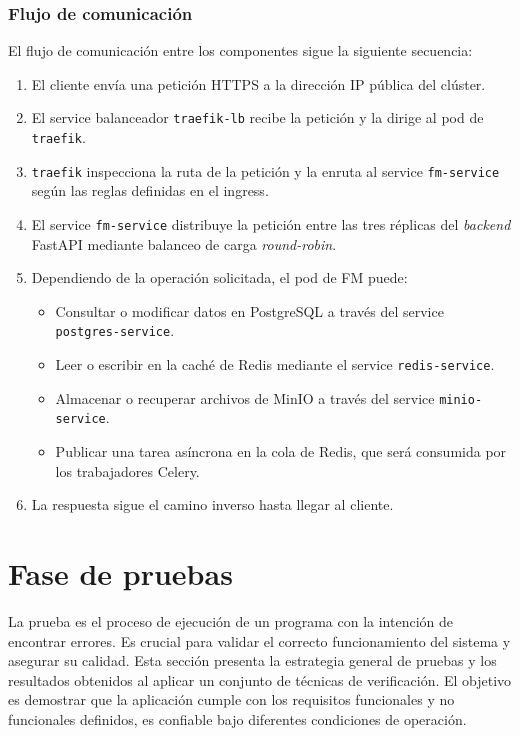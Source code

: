 \subsubsection{Flujo de comunicación}

El flujo de comunicación entre los componentes sigue la siguiente secuencia:

\begin{enumerate}
    \item El cliente envía una petición \ac{HTTPS} a la dirección \ac{IP} pública del \gls{clúster}.
    \item El \gls{service} balanceador \texttt{traefik-lb} recibe la petición y la dirige al \gls{pod} de \texttt{traefik}.
    \item \texttt{traefik} inspecciona la ruta de la petición y la enruta al \gls{service} \texttt{fm-service} según las reglas definidas en el \gls{ingress}.
    \item El \gls{service} \texttt{fm-service} distribuye la petición entre las tres réplicas del \textit{backend} FastAPI mediante balanceo de carga \textit{round-robin}.
    \item Dependiendo de la operación solicitada, el \gls{pod} de \ac{FM} puede:
    \begin{itemize}
        \item Consultar o modificar datos en PostgreSQL a través del \gls{service} \texttt{postgres-service}.
        \item Leer o escribir en la caché de Redis mediante el \gls{service} \texttt{redis-service}.
        \item Almacenar o recuperar archivos de MinIO a través del \gls{service} \texttt{minio-service}.
        \item Publicar una tarea asíncrona en la cola de Redis, que será consumida por los trabajadores Celery.
    \end{itemize}
    \item La respuesta sigue el camino inverso hasta llegar al cliente.
\end{enumerate}


\section{Fase de pruebas}

La prueba es el proceso de ejecución de un programa con la intención de encontrar errores.
Es crucial para validar el correcto funcionamiento del sistema y asegurar su calidad.
Esta sección presenta la estrategia general de pruebas y los resultados obtenidos al aplicar un conjunto de
técnicas de verificación. El objetivo es demostrar que la aplicación cumple con los requisitos funcionales y
no funcionales definidos, es confiable bajo diferentes condiciones de operación.

